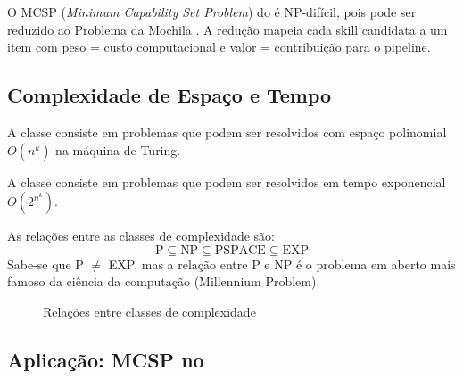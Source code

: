 \begin{exemplo}
    O MCSP (\textit{Minimum Capability Set Problem}) do \opencodeeco{} é
    NP-difícil, pois pode ser reduzido ao Problema da Mochila
    \cite{opencode2026scanner}. A redução mapeia cada skill candidata a um
    item com peso = custo computacional e valor = contribuição para o
    pipeline.
\end{exemplo}

\subsection{Complexidade de Espaço e Tempo}

\begin{definicao}
    A classe  consiste em problemas que podem ser resolvidos
    com espaço polinomial $O(n^k)$ na máquina de Turing.
\end{definicao}

\begin{definicao}
    A classe  consiste em problemas que podem ser resolvidos em
    tempo exponencial $O(2^{n^k})$.
\end{definicao}

As relações entre as classes de complexidade são:
\[
\text{P} \subseteq \text{NP} \subseteq \text{PSPACE} \subseteq \text{EXP}
\]
Sabe-se que P $\neq$ EXP, mas a relação entre P e NP é o problema em aberto
mais famoso da ciência da computação (Millennium Problem).

\begin{figure}[htb]
    \centering
    \caption{Relações entre classes de complexidade}
    \label{fig:classes-complexidade}
\end{figure}

\subsection{Aplicação: MCSP no \opencodeeco{}}

